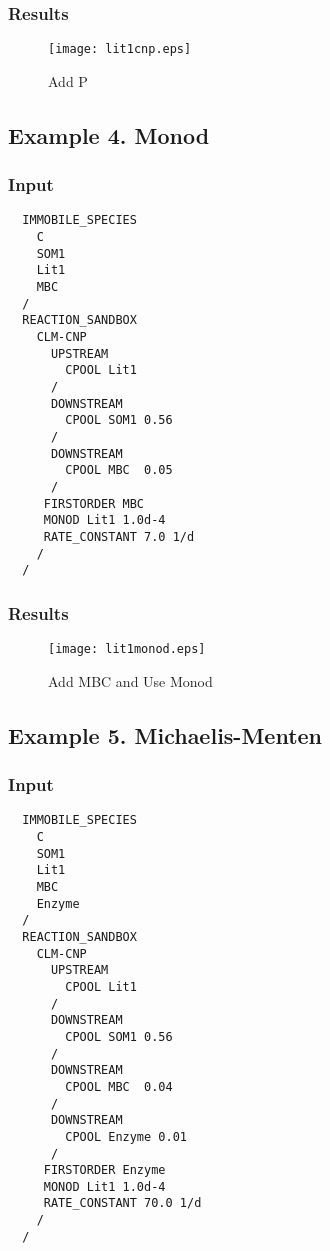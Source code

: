 \documentclass[12pt, a4paper]{article}
\begin{document}
\subsubsection{Results}
 \begin{figure}[h]
\centering
\texttt{[image: lit1cnp.eps]}
\caption{Add P}
\end{figure}

\clearpage
\subsection{Example 4. Monod}
\subsubsection{Input}
\begin{verbatim}
  IMMOBILE_SPECIES
    C   
    SOM1
    Lit1
    MBC 
  /
  REACTION_SANDBOX
    CLM-CNP
      UPSTREAM
        CPOOL Lit1
      /   
      DOWNSTREAM
        CPOOL SOM1 0.56
      /   
      DOWNSTREAM
        CPOOL MBC  0.05
      /   
     FIRSTORDER MBC 
     MONOD Lit1 1.0d-4
     RATE_CONSTANT 7.0 1/d 
    /   
  /
\end{verbatim}

\subsubsection{Results}
 \begin{figure}[h]
\centering
\texttt{[image: lit1monod.eps]}
\caption{Add MBC and Use Monod}
\end{figure}

\clearpage
\subsection{Example 5. Michaelis-Menten}
\subsubsection{Input}
\begin{verbatim}
  IMMOBILE_SPECIES
    C   
    SOM1
    Lit1
    MBC 
    Enzyme
  /
  REACTION_SANDBOX
    CLM-CNP
      UPSTREAM
        CPOOL Lit1
      /   
      DOWNSTREAM
        CPOOL SOM1 0.56
      /   
      DOWNSTREAM
        CPOOL MBC  0.04
      /   
      DOWNSTREAM
        CPOOL Enzyme 0.01
      /   
     FIRSTORDER Enzyme
     MONOD Lit1 1.0d-4
     RATE_CONSTANT 70.0 1/d 
    /   
  /
\end{verbatim}
\end{document}
